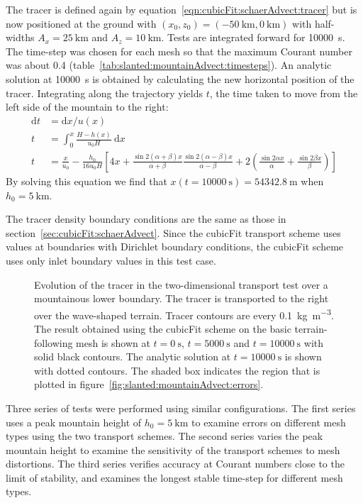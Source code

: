The tracer is defined again by equation~\eqref{eqn:cubicFit:schaerAdvect:tracer} but is now positioned at the ground with $(x_0, z_0) = (\SI{-50}{\kilo\meter}, \SI{0}{\kilo\meter})$ with half-widths $A_x = \SI{25}{\kilo\meter}$ and $A_z = \SI{10}{\kilo\meter}$.
Tests are integrated forward for \SI{10000}{\second}.  The time-step was chosen for each mesh so that the maximum Courant number was about \num{0.4} (table~\ref{tab:slanted:mountainAdvect:timesteps}).
An analytic solution at \SI{10000}{\second} is obtained by calculating the new horizontal position of the tracer.  Integrating along the trajectory yields $t$, the time taken to move from the left side of the mountain to the right:
\begin{align}
	\mathrm{d}t &= \mathrm{d}x / u(x) \\
	t &= \int_0^x \frac{H - h(x)}{u_0 H}\:\mathrm{d}x \\
	t &= \frac{x}{u_0} - \frac{h_0}{16 u_0 H} \left[ 4x + \frac{\sin 2 (\alpha + \beta) x}{\alpha + \beta} 
 \frac{\sin 2(\alpha - \beta) x}{\alpha - \beta} + 2 \left( \frac{\sin 2\alpha x}{\alpha} + \frac{\sin 2\beta x}{\beta} \right) \right]
\end{align}
By solving this equation we find that \(x(t=\SI{10000}{\second}) = \SI{54342.8}{\meter}\) when $h_0 = \SI{5}{\kilo\meter}$.

The tracer density boundary conditions are the same as those in section~\ref{sec:cubicFit:schaerAdvect}.
Since the cubicFit transport scheme uses values at boundaries with Dirichlet boundary conditions, the cubicFit scheme uses only inlet boundary values in this test case.

\begin{figure}
	\centering
	\caption{Evolution of the tracer in the two-dimensional transport test over a mountainous lower boundary.  The tracer is transported to the right over the wave-shaped terrain.  Tracer contours are every \SI{0.1}{\kilo\gram\per\meter\cubed}.  The result obtained using the cubicFit scheme on the basic terrain-following mesh is shown at $t=\SI{0}{\second}$, $t=\SI{5000}{\second}$ and $t=\SI{10000}{\second}$ with solid black contours. The analytic solution at $t=\SI{10000}{\second}$ is shown with dotted contours.
	The shaded box indicates the region that is plotted in figure~\ref{fig:slanted:mountainAdvect:errors}.}
	\label{fig:slanted:mountainAdvect:tracer}
\end{figure}

Three series of tests were performed using similar configurations.  The first series uses a peak mountain height of $h_0 = \SI{5}{\kilo\meter}$ to examine errors on different mesh types using the two transport schemes.
The second series varies the peak mountain height to examine the sensitivity of the transport schemes to mesh distortions.
The third series verifies accuracy at Courant numbers close to the limit of stability, and examines the longest stable time-step for different mesh types.

